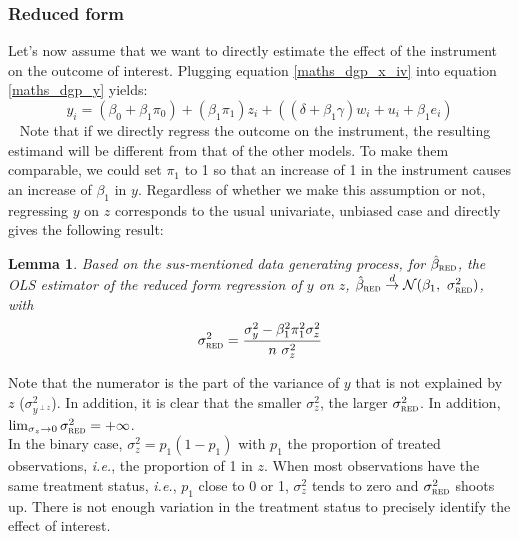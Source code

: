 \documentclass[usletter, 12pt]{article}
\newtheorem{lemma}{Lemma}
\begin{document}
				 

		\subsubsection{Reduced form}
		
			Let's now assume that we want to directly estimate the effect of the instrument on the outcome of interest. Plugging equation \ref{maths_dgp_x_iv} into equation \ref{maths_dgp_y} yields:			
				\[
					y_{i} = (\beta_{0} + \beta_{1}\pi_0) + (\beta_{1}\pi_{1}) z_{i} + ((\delta + \beta_{1}\gamma) w_{i} + u_{i} + \beta_{1}e_{i})
				\]
				~
				Note that if we directly regress the outcome on the instrument, the resulting estimand will be different from that of the other models. To make them comparable, we could set $\pi_{1}$ to 1 so that an increase of 1 in the instrument causes an increase of $\beta_{1}$ in $y$. Regardless of whether we make this assumption or not, regressing $y$ on $z$ corresponds to the usual univariate, unbiased case and directly gives the following result:
				
				\begin{lemma}\label{lemma_red}
					Based on the sus-mentioned data generating process, for $\hat{\beta}_{\textsc{red}}$, the OLS estimator of the reduced form regression of $y$ on $z$,  $\hat{\beta}_{\textsc{red}} \overset{d}{\to} \mathcal{N}(\beta_{1}, \ \sigma_{\textsc{red}}^{2})$, with
					\[
						\sigma_{\textsc{red}}^{2} = \dfrac{\sigma_{y}^{2} - \beta_{1}^{2}\pi_{1}^{2}\sigma_{z}^{2}}{n \ \sigma_{z}^{2}}
					\]
				\end{lemma}
				
				Note that the numerator is the part of the variance of $y$ that is not explained by $z$ ($\sigma^{2}_{y^{\perp z}}$). In addition, it is clear that the smaller $\sigma_{z}^{2}$, the larger $\sigma_{\textsc{red}}^{2}$. In addition, $\lim_{\sigma_{z}\to 0} \sigma_{\textsc{red}}^{2} = + \infty$.\\
				
				In the binary case, $\sigma_{z}^{2} = p_{1}(1-p_{1})$ with $p_{1}$ the proportion of treated observations, \textit{i.e.}, the proportion of 1 in $z$. When most observations have the same treatment status, \textit{i.e.}, $p_{1}$ close to 0 or 1, $\sigma_{z}^{2}$ tends to zero and $\sigma_{\textsc{red}}^{2}$ shoots up. There is not enough variation in the treatment status to precisely identify the effect of interest. 
				
\end{document}
